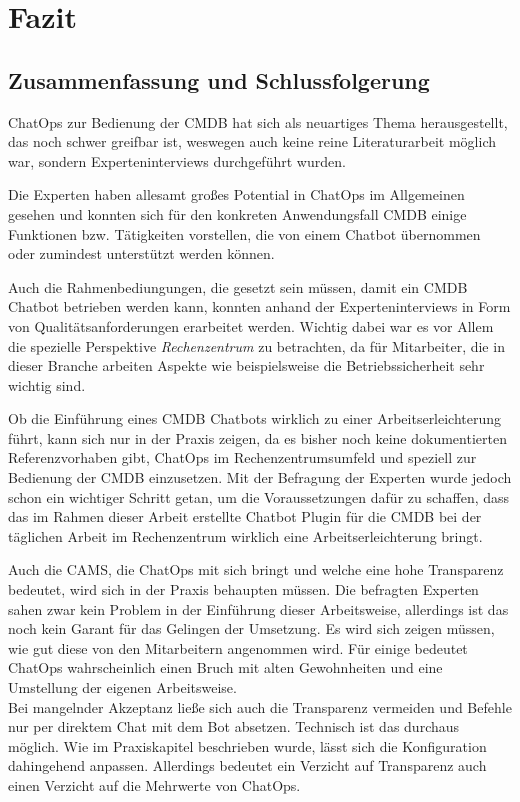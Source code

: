 \chapter{Fazit} \label{Fazit}

\section{Zusammenfassung und Schlussfolgerung}
ChatOps zur Bedienung der \acs{CMDB} hat sich als neuartiges Thema herausgestellt, das noch schwer greifbar ist, weswegen auch keine reine Literaturarbeit möglich war, sondern Experteninterviews durchgeführt wurden.

Die Experten haben allesamt großes Potential in ChatOps im Allgemeinen gesehen und konnten sich für den konkreten Anwendungsfall \acs{CMDB} einige Funktionen bzw. Tätigkeiten  vorstellen, die von einem Chatbot übernommen oder zumindest unterstützt werden können.

Auch die Rahmenbediungungen, die gesetzt sein müssen, damit ein \acs{CMDB} Chatbot betrieben werden kann, konnten anhand der Experteninterviews in Form von Qualitätsanforderungen erarbeitet werden. Wichtig dabei war es vor Allem die spezielle Perspektive \textit{Rechenzentrum} zu betrachten, da für Mitarbeiter, die in dieser Branche arbeiten Aspekte wie beispielsweise die Betriebssicherheit sehr wichtig sind. %

Ob die Einführung eines \acs{CMDB} Chatbots wirklich zu einer Arbeitserleichterung führt, kann sich nur in der Praxis zeigen, da es bisher noch keine dokumentierten Referenzvorhaben gibt, ChatOps im Rechenzentrumsumfeld und speziell zur Bedienung der \acs{CMDB} einzusetzen. Mit der Befragung der Experten wurde jedoch schon ein wichtiger Schritt getan, um die Voraussetzungen dafür zu schaffen, dass das im Rahmen dieser Arbeit erstellte Chatbot Plugin für die \acs{CMDB} bei der täglichen Arbeit im Rechenzentrum wirklich eine Arbeitserleichterung bringt.

Auch die \acl{CAMS}, die ChatOps mit sich bringt und welche eine hohe Transparenz bedeutet, wird sich in der Praxis behaupten müssen. Die befragten Experten sahen zwar kein Problem in der Einführung dieser Arbeitsweise, allerdings ist das noch kein Garant für das Gelingen der Umsetzung. Es wird sich zeigen müssen, wie gut diese von den Mitarbeitern angenommen wird. Für einige bedeutet ChatOps wahrscheinlich einen Bruch mit alten Gewohnheiten und eine Umstellung der eigenen Arbeitsweise.\\
Bei mangelnder Akzeptanz ließe sich auch die Transparenz vermeiden und Befehle nur per direktem Chat mit dem Bot absetzen. Technisch ist das durchaus möglich. Wie im Praxiskapitel beschrieben wurde, lässt sich die Konfiguration dahingehend anpassen. Allerdings bedeutet ein Verzicht auf Transparenz auch einen Verzicht auf die Mehrwerte von ChatOps.

